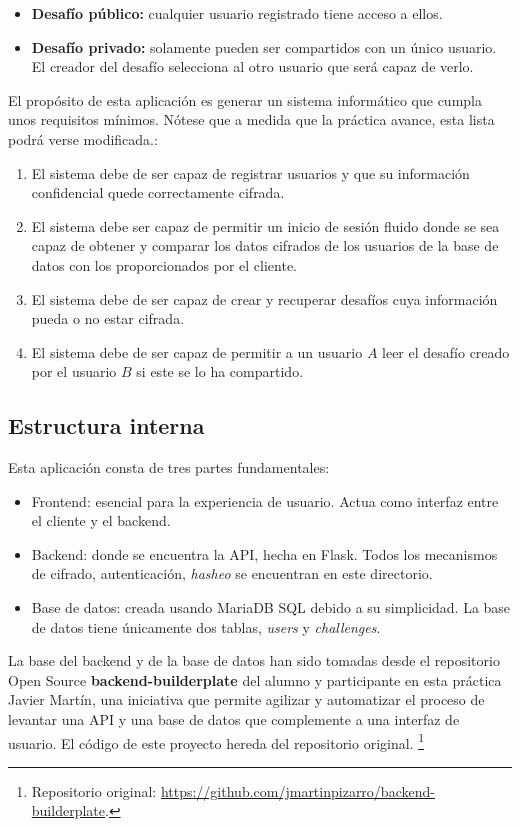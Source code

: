 \documentclass[a4paper,11pt]{article}
\begin{document}
\begin{itemize}
    \item \textbf{Desafío público:} cualquier usuario registrado tiene acceso a ellos.
    \item \textbf{Desafío privado:} solamente pueden ser compartidos con un único usuario. El creador del desafío selecciona al otro usuario que será capaz de verlo.
\end{itemize}

El propósito de esta aplicación es generar un sistema informático que cumpla unos requisitos mínimos. Nótese que a medida que la práctica avance, esta lista podrá verse modificada.:\begin{enumerate}
    \item El sistema debe de ser capaz de registrar usuarios y que su información confidencial quede correctamente cifrada.
    \item El sistema debe ser capaz de permitir un inicio de sesión fluido donde se sea capaz de obtener y comparar los datos cifrados de los usuarios de la base de datos con los proporcionados por el cliente.
    \item El sistema debe de ser capaz de crear y recuperar desafíos cuya información pueda o no estar cifrada.
    \item El sistema debe de ser capaz de permitir a un usuario $A$ leer el desafío creado por el usuario $B$ si este se lo ha compartido.
\end{enumerate}

\subsection{Estructura interna}

Esta aplicación consta de tres partes fundamentales:
\begin{itemize}
    \item Frontend: esencial para la experiencia de usuario. Actua como interfaz entre el cliente y el backend.
    \item Backend: donde se encuentra la API, hecha en Flask. Todos los mecanismos de cifrado, autenticación, \textit{hasheo} se encuentran en este directorio.
    \item Base de datos: creada usando MariaDB SQL debido a su simplicidad. La base de datos tiene únicamente dos tablas, \textit{users} y \textit{challenges}.
\end{itemize}

La base del backend y de la base de datos han sido tomadas desde el repositorio Open Source \textbf{backend-builderplate} del alumno y participante en esta práctica Javier Martín, una iniciativa que permite agilizar y automatizar el proceso de levantar una API y una base de datos que complemente a una interfaz de usuario. El código de este proyecto hereda del repositorio original.%
\footnote{Repositorio original: \url{https://github.com/jmartinpizarro/backend-builderplate}.}
\end{document}
